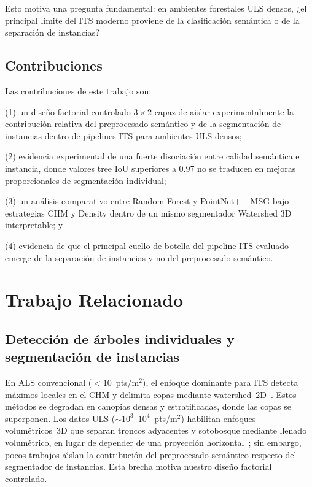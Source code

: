 \documentclass{cys}
\begin{document}
Esto motiva una pregunta fundamental: en ambientes forestales ULS densos, ¿el principal límite del ITS moderno proviene de la clasificación semántica o de la separación de instancias?

\subsection{Contribuciones}

Las contribuciones de este trabajo son:

(1) un diseño factorial controlado $3 \times 2$ capaz de aislar experimentalmente la contribución relativa del preprocesado semántico y de la segmentación de instancias dentro de pipelines ITS para ambientes ULS densos;

(2) evidencia experimental de una fuerte disociación entre calidad semántica e instancia, donde valores tree IoU superiores a 0.97 no se traducen en mejoras proporcionales de segmentación individual;

(3) un análisis comparativo entre Random Forest y PointNet++ MSG bajo estrategias CHM y Density dentro de un mismo segmentador Watershed 3D interpretable; y

(4) evidencia de que el principal cuello de botella del pipeline ITS evaluado emerge de la separación de instancias y no del preprocesado semántico.


\section{Trabajo Relacionado}\label{sec:related}

\subsection{Detección de árboles individuales y segmentación de instancias}

En ALS convencional (${<}10$~pts/m$^2$), el enfoque dominante para ITS detecta m\'aximos locales en el CHM y delimita copas mediante watershed~2D~\cite{popescu2002,silva2016,dalponte2016}. Estos m\'etodos se degradan en canopias densas y estratificadas, donde las copas se superponen. Los datos ULS (${\sim}10^3$--$10^4$~pts/m$^2$) habilitan enfoques volum\'etricos~3D que separan troncos adyacentes y sotobosque mediante llenado volum\'etrico, en lugar de depender de una proyecci\'on horizontal~\cite{dalponte2016}; sin embargo, pocos trabajos a\'\i{}slan la contribuci\'on del preprocesado sem\'antico respecto del segmentador de instancias. Esta brecha motiva nuestro dise\~no factorial controlado.
\end{document}
